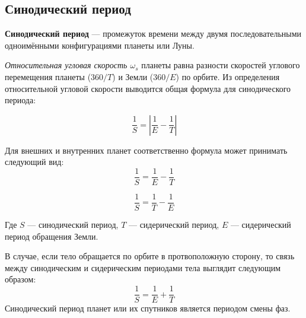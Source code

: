 \subsection{Синодический период}

{\sffamily \bfseries Синодический период} --- промежуток времени между двумя 
последовательными одноимёнными конфигурациями планеты или Луны.

\textit{Относительная угловая скорость $\mathit{\omega_s}$} планеты равна 
разности скоростей углового перемещения планеты ($360/T$) и Земли ($360/E$) по 
орбите. Из определения относительной угловой скорости выводится общая формула 
для синодического периода:

\begin{equation}
\frac1S=\left|\frac1E-\frac1T\right|
\end{equation}

Для внешних и внутренних планет соответственно формула может принимать 
следующий вид:
\begin{equation}\frac1S=\frac1E-\frac1T
\end{equation}

\begin{equation}\frac1S=\frac1T-\frac1E
\end{equation}

Где $S$ --- синодический период, $T$ --- сидерический период, $E$ --- 
сидерический период обращения Земли.

В случае, если тело обращается по орбите в протвоположную сторону, то связь 
между синодическим и сидерическим периодами тела выглядит следующим образом:
\begin{equation}\frac1S=\frac1E+\frac1T
\end{equation}
Синодический период планет или их спутников является периодом смены фаз. 
